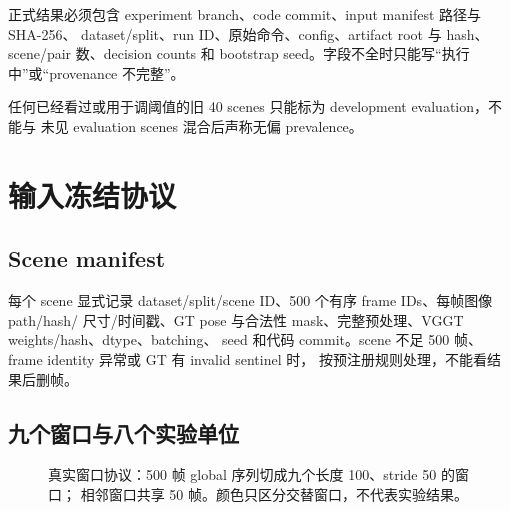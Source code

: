 \documentclass[UTF8,a4paper,11pt]{ctexart}
\begin{document}
正式结果必须包含 experiment branch、code commit、input manifest 路径与 SHA-256、
dataset/split、run ID、原始命令、config、artifact root 与 hash、scene/pair 数、decision
counts 和 bootstrap seed。字段不全时只能写“执行中”或“provenance 不完整”。

任何已经看过或用于调阈值的旧 40 scenes 只能标为 development evaluation，不能与
未见 evaluation scenes 混合后声称无偏 prevalence。

\section{输入冻结协议}

\subsection{Scene manifest}

每个 scene 显式记录 dataset/split/scene ID、500 个有序 frame IDs、每帧图像 path/hash/
尺寸/时间戳、GT pose 与合法性 mask、完整预处理、VGGT weights/hash、dtype、batching、
seed 和代码 commit。scene 不足 500 帧、frame identity 异常或 GT 有 invalid sentinel 时，
按预注册规则处理，不能看结果后删帧。

\subsection{九个窗口与八个实验单位}

\begin{figure}[htbp]
  \centering
  \caption{真实窗口协议：500 帧 global 序列切成九个长度 100、stride 50 的窗口；
  相邻窗口共享 50 帧。颜色只区分交替窗口，不代表实验结果。}
  \label{fig:window-overlap}
\end{figure}
\end{document}
